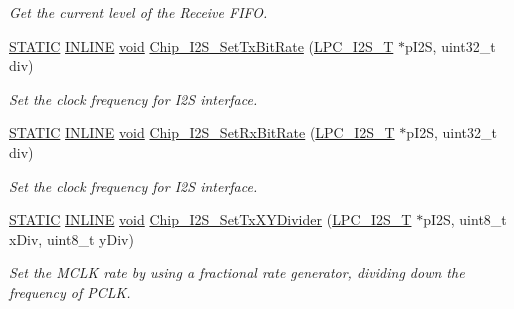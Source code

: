 \begin{DoxyCompactItemize}
\begin{DoxyCompactList}\small\item\em Get the current level of the Receive F\-I\-F\-O. \end{DoxyCompactList}\item 
\hyperlink{group__LPC__Types__Public__Macros_ga10b2d890d871e1489bb02b7e70d9bdfb}{S\-T\-A\-T\-I\-C} \hyperlink{group__LPC__Types__Public__Types_ga2eb6f9e0395b47b8d5e3eeae4fe0c116}{I\-N\-L\-I\-N\-E} \hyperlink{Paradigm_2Tern__EE_2small_2portmacro_8h_a14d32f8130d3c0b212cfc751730b5b49}{void} \hyperlink{group__I2S__17XX__40XX_ga4ab6d7b26edf92c1b7bcb7f6f9326888}{Chip\-\_\-\-I2\-S\-\_\-\-Set\-Tx\-Bit\-Rate} (\hyperlink{structLPC__I2S__T}{L\-P\-C\-\_\-\-I2\-S\-\_\-\-T} $\ast$p\-I2\-S, uint32\-\_\-t div)
\begin{DoxyCompactList}\small\item\em Set the clock frequency for I2\-S interface. \end{DoxyCompactList}\item 
\hyperlink{group__LPC__Types__Public__Macros_ga10b2d890d871e1489bb02b7e70d9bdfb}{S\-T\-A\-T\-I\-C} \hyperlink{group__LPC__Types__Public__Types_ga2eb6f9e0395b47b8d5e3eeae4fe0c116}{I\-N\-L\-I\-N\-E} \hyperlink{Paradigm_2Tern__EE_2small_2portmacro_8h_a14d32f8130d3c0b212cfc751730b5b49}{void} \hyperlink{group__I2S__17XX__40XX_gaf18685ebc3f86581fd7075fafe4c72e7}{Chip\-\_\-\-I2\-S\-\_\-\-Set\-Rx\-Bit\-Rate} (\hyperlink{structLPC__I2S__T}{L\-P\-C\-\_\-\-I2\-S\-\_\-\-T} $\ast$p\-I2\-S, uint32\-\_\-t div)
\begin{DoxyCompactList}\small\item\em Set the clock frequency for I2\-S interface. \end{DoxyCompactList}\item 
\hyperlink{group__LPC__Types__Public__Macros_ga10b2d890d871e1489bb02b7e70d9bdfb}{S\-T\-A\-T\-I\-C} \hyperlink{group__LPC__Types__Public__Types_ga2eb6f9e0395b47b8d5e3eeae4fe0c116}{I\-N\-L\-I\-N\-E} \hyperlink{Paradigm_2Tern__EE_2small_2portmacro_8h_a14d32f8130d3c0b212cfc751730b5b49}{void} \hyperlink{group__I2S__17XX__40XX_gaab4e4a66774d56ba378cce2dbc34e9b0}{Chip\-\_\-\-I2\-S\-\_\-\-Set\-Tx\-X\-Y\-Divider} (\hyperlink{structLPC__I2S__T}{L\-P\-C\-\_\-\-I2\-S\-\_\-\-T} $\ast$p\-I2\-S, uint8\-\_\-t x\-Div, uint8\-\_\-t y\-Div)
\begin{DoxyCompactList}\small\item\em Set the M\-C\-L\-K rate by using a fractional rate generator, dividing down the frequency of P\-C\-L\-K. \end{DoxyCompactList}\item 

\end{DoxyCompactItemize}
